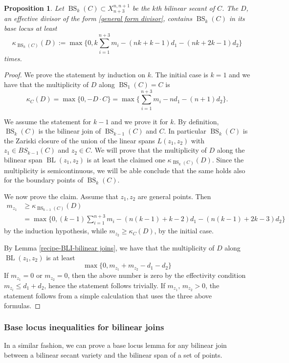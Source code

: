 \documentclass[a4paper,11pt]{article}
\newtheorem{proposition}[theorem]{Proposition}
\newcommand{\BL}{\operatorname{BL}}
\newcommand{\BS}{\operatorname{BS}}
\begin{document}
\begin{proposition} \label{prop-bli-bisecant}
Let $\BS_k(C)\subset X^{n,n+1}_{n+3}$ be the $k$th bilinear secant of $C$. The $D$, an effective divisor of the form \eqref{general form divisor}, contains $\BS_k(C)$ in its base locus at least
$$
\kappa_{\BS_k(C)}(D):=\max\{0,k\sum_{i=1}^{n+3}m_i-(nk+k-1)d_1-(nk+2k-1)d_2\}
$$ times.
\end{proposition}
\begin{proof}
We prove the statement by induction on $k$.
The initial case is $k=1$ and we have that the multiplicity of $D$ along $\BS_1(C)=C$ is 
$$
\kappa_C(D)=\max\{0,-D\cdot C\}= \max\{\sum_{i=1}^{n+3}m_i-nd_1-(n+1)d_2\}.
$$

We assume the statement for $k-1$ and we prove it for $k$.
By definition, $\BS_k(C)$ is the bilinear join of $\BS_{k-1}(C)$ and $C$. In particular  $\BS_k(C)$ is the Zariski closure of the union of the linear spans $L(z_1,z_2)$ with $z_1\in BS_{k-1}(C)$ and $z_2\in C$.
We will prove that the multiplicity of $D$ along the bilinear span $\BL(z_1,z_2)$ is at least the claimed one $\kappa_{\BS_k(C)}(D)$. Since the multiplicity is semicontinuous, we will be able conclude that the same holds also for the boundary points of $\BS_k(C)$.

We now prove the claim.
Assume that $z_1,z_2$ are general points. 
Then 
\begin{align*} 
m_{z_1}&\ge\kappa_{\BS_{k-1}(C)}(D)\\
&=\max\{0,(k-1)\sum_{i=1}^{n+3}m_i-(n(k-1)+k-2)d_1-(n(k-1)+2k-3)d_2\}
\end{align*}
by the induction hypothesis, while 
$m_{z_2}\ge \kappa_C(D)$, by the initial case.


By Lemma \ref{recipe-BLI-bilinear joins}, we have that the multiplicity of $D$ along $\BL(z_1,z_2)$ is at least 
$$
\max\{0,m_{z_1}+m_{z_2}-d_1-d_2\}
$$
%
 If $m_{z_1}=0$ or $m_{z_2}=0$, then the above number is zero by the effectivity condition $m_{z_i}\le d_1+d_2$, hence the statement follows trivially. If $m_{z_1}, \, m_{z_2}>0$, the statement follows from a simple calculation that uses the three above formulas. \end{proof}


\subsubsection{Base locus inequalities for bilinear joins}
In a similar fashion, we can prove a base locus lemma for any bilinear join between a bilinear secant variety and the bilinear span of a set of points.
\end{document}
